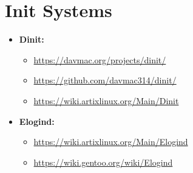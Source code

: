 \documentclass[10pt, a4paper, onecolumn, oneside, titlepage, openany]{book}
\begin{document}
\section{Init Systems}
\begin{itemize}
    \item \textbf{Dinit:}
    \begin{itemize}
        \item \url{https://davmac.org/projects/dinit/}
        \item \url{https://github.com/davmac314/dinit/}
        \item \url{https://wiki.artixlinux.org/Main/Dinit}
    \end{itemize}
    \item \textbf{Elogind:}
    \begin{itemize}
        \item \url{https://wiki.artixlinux.org/Main/Elogind}
        \item \url{https://wiki.gentoo.org/wiki/Elogind}
    \end{itemize}
\end{itemize}
\end{document}
